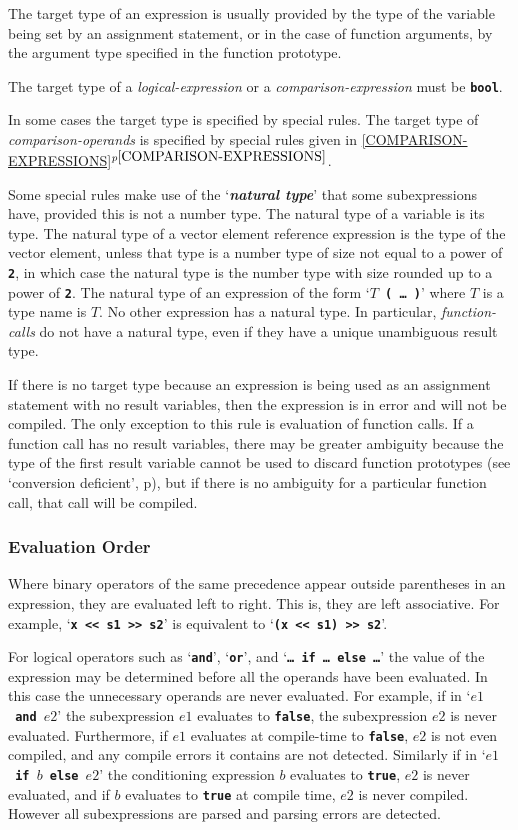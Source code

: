 \documentclass[12pt]{article}
\newcommand{\TT}[1]{{\tt \bfseries #1}}
\newcommand{\key}[1]{{\bf \em #1}\index{#1}}
\newcommand{\itemref}[1]{\ref{#1}$^{p\pageref{#1}}$}
\newcommand{\pagref}[1]{p\pageref{#1}}
\begin{document}
The target type of an expression is usually provided by the
type of the variable being set by an assignment statement, or in the
case of function arguments, by the argument type specified in the
function prototype.

The target type of a {\em logical-expression} or a {\em comparison-expression}
must be \TT{bool}.

In some cases the target type is specified by special rules.  The
target type of {\em comparison-operands} is specified by special
rules given in \itemref{COMPARISON-EXPRESSIONS}.

Some special rules
make use of the `\key{natural type}'\label{NATURAL-TYPE}
that some subexpressions have, provided this is not a number type.
The natural type of a variable is its type.  The natural
type of a vector element reference expression is the type of the
vector element, unless that type is a number type of size not
equal to a power of \TT{2}, in which case the natural type is
the number type with size rounded up to a power of \TT{2}.
The natural type of an expression of the
form `\TT{$T$ ( \ldots{} )}' where $T$ is a type name is $T$.
No other expression has a natural type.  In particular,
{\em function-calls} do not have a natural type, even if
they have a unique unambiguous result type.

If there is no target type because an expression is being used
as an assignment statement with no result variables, then
the expression is in error and will not be compiled.
The only exception to this rule
is evaluation of function calls.  If a function call has no
result variables, there may be greater ambiguity because the
type of the first result variable cannot be used to discard function
prototypes (see `conversion deficient', \pagref{CONVERSION-DEFICIENT}),
but if there is no ambiguity for a particular
function call, that call will be compiled.

\subsubsection{Evaluation Order}
\label{EVALUATION-ORDER}

Where binary operators of the same precedence appear outside
parentheses in an expression, they are evaluated left to right.
This is, they are left associative.  For example,
`\TT{x <{}< s1 >{}> s2}' is
equivalent to `\TT{(x <{}< s1) >{}> s2}'.

For logical operators such as `\TT{and}', `\TT{or}', and
`\TT{\ldots{}~if~\ldots{}~else~\ldots{}}' the value of the expression
may be determined before all the operands have been evaluated.
In this case the unnecessary operands are never evaluated.
For example, if in `\TT{$e1$~and~$e2$}' the subexpression $e1$
evaluates to \TT{false}, the subexpression $e2$ is never evaluated.
Furthermore, if $e1$ evaluates at compile-time to \TT{false},
$e2$ is not even compiled, and any compile errors it contains
are not detected.  Similarly if in `\TT{$e1$~if~$b$~else~$e2$}' the
conditioning expression $b$ evaluates to \TT{true}, $e2$ is
never evaluated, and if $b$ evaluates to \TT{true} at compile
time, $e2$ is never compiled.  However all subexpressions are parsed and
parsing errors are detected.
\end{document}
